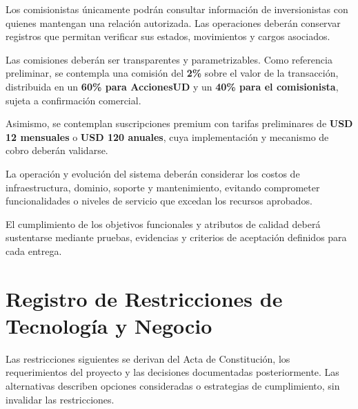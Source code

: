 \documentclass[11pt,a4paper,oneside]{article}
\begin{document}
Los comisionistas únicamente podrán consultar
información de inversionistas con quienes mantengan
una relación autorizada. Las operaciones deberán
conservar registros que permitan verificar sus
estados, movimientos y cargos asociados.

Las comisiones deberán ser transparentes y
parametrizables. Como referencia preliminar, se
contempla una comisión del \textbf{2\%} sobre el
valor de la transacción, distribuida en un
\textbf{60\% para AccionesUD} y un
\textbf{40\% para el comisionista}, sujeta a
confirmación comercial.

Asimismo, se contemplan suscripciones premium
con tarifas preliminares de \textbf{USD 12 mensuales}
o \textbf{USD 120 anuales}, cuya implementación
y mecanismo de cobro deberán validarse.

La operación y evolución del sistema deberán
considerar los costos de infraestructura, dominio,
soporte y mantenimiento, evitando comprometer
funcionalidades o niveles de servicio que excedan
los recursos aprobados.

El cumplimiento de los objetivos funcionales
y atributos de calidad deberá sustentarse mediante
pruebas, evidencias y criterios de aceptación
definidos para cada entrega.


\section{Registro de Restricciones de Tecnología y Negocio}
\label{an:restricciones}

Las restricciones siguientes se derivan del Acta de Constitución,
los requerimientos del proyecto y las decisiones documentadas
posteriormente. Las alternativas describen opciones consideradas
o estrategias de cumplimiento, sin invalidar las restricciones.
\end{document}
